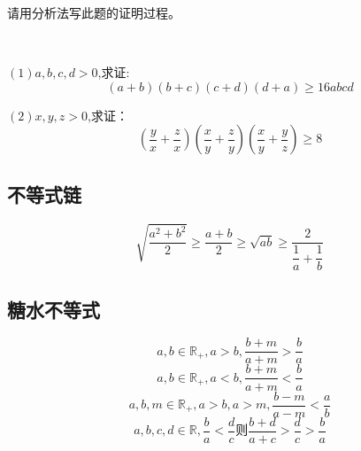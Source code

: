 \begin{zhu}
    请用分析法写此题的证明过程。
\end{zhu}
\clearpage
\begin{exercise}
    \ 

    $(1)a,b,c,d>0$,求证:
    \[(a+b)(b+c)(c+d)(d+a)\geq 16abcd\]

    $(2)x,y,z>0$,求证：
    \[(\frac{y}{x}+\frac{z}{x})(\frac{x}{y}+\frac{z}{y})(\frac{x}{y}+\frac{y}{z})\geq8\]

\end{exercise}
\clearpage
\subsection{不等式链}
\[\sqrt{\frac{a^2+b^2}{2}} \geq \frac{a+b}{2}\geq \sqrt{ab}\geq \frac{2}{\dfrac{1}{a}+\dfrac{1}{b}}\]

\clearpage
\subsection{糖水不等式}
\begin{theorem}
    
\end{theorem}
\[a,b\in \mathbb{R}_+,a>b,\frac{b+m}{a+m}>\frac{b}{a}\]
\[a,b\in \mathbb{R}_+,a<b,\frac{b+m}{a+m}<\frac{b}{a}\]
\[a,b,m\in \mathbb{R}_+,a>b,a>m,\frac{b-m}{a-m}<\frac{a}{b}\]
\[a,b,c,d\in \mathbb{R} ,\frac{b}{a}<\frac{d}{c}\text{则}\frac{b+d}{a+c}>\frac{d}{c}>\frac{b}{a}\]

\clearpage
